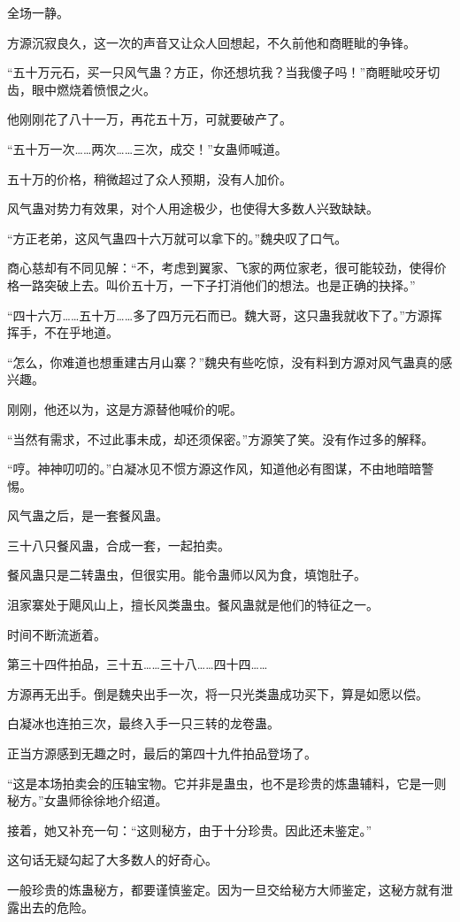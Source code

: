 \begin{this_body}
全场一静。

方源沉寂良久，这一次的声音又让众人回想起，不久前他和商睚眦的争锋。

“五十万元石，买一只风气蛊？方正，你还想坑我？当我傻子吗！”商睚眦咬牙切齿，眼中燃烧着愤恨之火。

他刚刚花了八十一万，再花五十万，可就要破产了。

“五十万一次……两次……三次，成交！”女蛊师喊道。

五十万的价格，稍微超过了众人预期，没有人加价。

风气蛊对势力有效果，对个人用途极少，也使得大多数人兴致缺缺。

“方正老弟，这风气蛊四十六万就可以拿下的。”魏央叹了口气。

商心慈却有不同见解：“不，考虑到翼家、飞家的两位家老，很可能较劲，使得价格一路突破上去。叫价五十万，一下子打消他们的想法。也是正确的抉择。”

“四十六万……五十万……多了四万元石而已。魏大哥，这只蛊我就收下了。”方源挥挥手，不在乎地道。

“怎么，你难道也想重建古月山寨？”魏央有些吃惊，没有料到方源对风气蛊真的感兴趣。

刚刚，他还以为，这是方源替他喊价的呢。

“当然有需求，不过此事未成，却还须保密。”方源笑了笑。没有作过多的解释。

“哼。神神叨叨的。”白凝冰见不惯方源这作风，知道他必有图谋，不由地暗暗警惕。

风气蛊之后，是一套餐风蛊。

三十八只餐风蛊，合成一套，一起拍卖。

餐风蛊只是二转蛊虫，但很实用。能令蛊师以风为食，填饱肚子。

沮家寨处于飓风山上，擅长风类蛊虫。餐风蛊就是他们的特征之一。

时间不断流逝着。

第三十四件拍品，三十五……三十八……四十四……

方源再无出手。倒是魏央出手一次，将一只光类蛊成功买下，算是如愿以偿。

白凝冰也连拍三次，最终入手一只三转的龙卷蛊。

正当方源感到无趣之时，最后的第四十九件拍品登场了。

“这是本场拍卖会的压轴宝物。它并非是蛊虫，也不是珍贵的炼蛊辅料，它是一则秘方。”女蛊师徐徐地介绍道。

接着，她又补充一句：“这则秘方，由于十分珍贵。因此还未鉴定。”

这句话无疑勾起了大多数人的好奇心。

一般珍贵的炼蛊秘方，都要谨慎鉴定。因为一旦交给秘方大师鉴定，这秘方就有泄露出去的危险。


\end{this_body}
